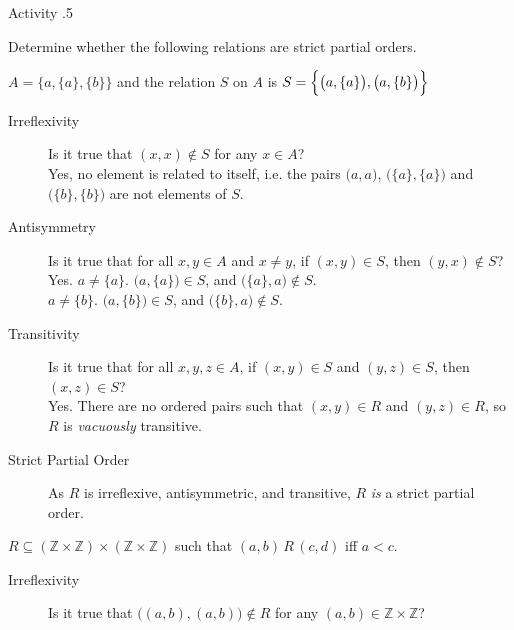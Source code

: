 \documentclass[\main/notes.tex]{subfiles}
\begin{document}
				\begin{exercise}{Activity \thechapter.5}
					\begin{questions}
						\item Determine whether the following relations are strict partial orders.
							\begin{questions}
								\item $A = \bigl\{a, \{a\}, \{b\}\bigr\}$ and the relation $S$ on $A$ is $S = \Bigl\{\bigl(a, \{a\}\bigr), \bigl(a, \{b\}\bigr)\Bigr\}$
									\begin{answer}
										\begin{description}
											\item[Irreflexivity] Is it true that $(x, x) \notin S$ for any $x \in A$?\\
												Yes, no element is related to itself, i.e. the pairs $\bigl(a, a\bigr)$, $\bigl(\{a\}, \{a\}\bigr)$ and $\bigl(\{b\}, \{b\}\bigr)$ are not elements of $S$.
											\item[Antisymmetry] Is it true that for all $x, y \in A$ and $x \neq y $, if $(x, y) \in S$, then $(y, x) \notin S$?\\
												Yes. $a \neq \{a\}$. $\bigl(a, \{a\}\bigr) \in S$, and $\bigl(\{a\}, a\bigr) \notin S$.\\   
												$a \neq \{b\}$. $\bigl(a, \{b\}\bigr) \in S$, and $\bigl(\{b\}, a\bigr) \notin S$.
											\item[Transitivity] Is it true that for all $x, y, z \in A$, if $(x, y) \in S$ and $(y, z) \in S$, then $(x, z) \in S$?\\
												Yes. There are no ordered pairs such that $(x, y) \in R$ and $(y, z) \in R$, so $R$ is \emph{vacuously} transitive.
											\item[Strict Partial Order] As $R$ is irreflexive, antisymmetric, and transitive, $R$ \emph{is} a strict partial order.
										\end{description}
									\end{answer}
								\pagebreak
								\item $R \subseteq (\mathbb{Z} \times \mathbb{Z}) \times (\mathbb{Z} \times \mathbb{Z})$ such that $(a, b) \, R \, (c, d)$ iff $a < c$.
									\begin{answer}
										\begin{description}
											\item[Irreflexivity] Is it true that $\bigl((a, b), (a, b)\bigr)\notin R$ for any $(a, b) \in \mathbb{Z} \times \mathbb{Z}$?\\

\end{description}
\end{answer}
\end{questions}
\end{questions}
\end{exercise}
\end{document}
